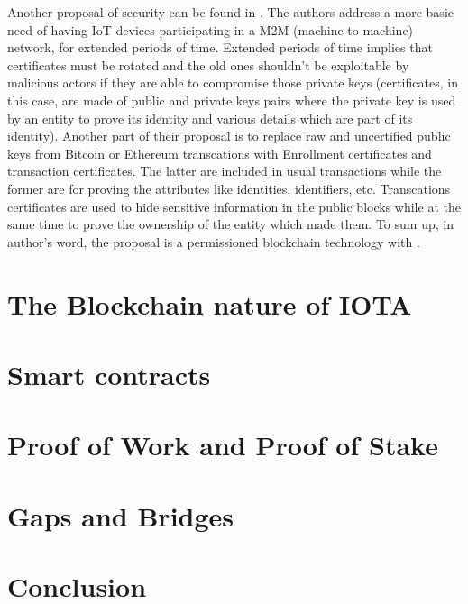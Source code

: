 \documentclass[a4paper,12pt,twoside]{book}
\begin{document}
    Another proposal of security can be found in \cite{SecuringUserIdentity}. The authors address a more basic need of having IoT devices participating in a M2M (machine-to-machine) network, for extended periods of time. Extended periods of time implies that certificates must be rotated and the old ones shouldn't be exploitable by malicious actors if they are able to compromise those private keys (certificates, in this case, are made of public and private keys pairs where the private key is used by an entity to prove its identity and various details which are part of its identity). Another part of their proposal is to replace raw and uncertified public keys from Bitcoin or Ethereum transcations with Enrollment certificates and transaction certificates. The latter are included in usual transactions while the former are for proving the attributes like identities, identifiers, etc. Transcations certificates are used to hide sensitive information in the public blocks while at the same time to prove the ownership of the entity which made them. To sum up, in author's word, the proposal is a permissioned blockchain technology with .




\section{The Blockchain nature of IOTA}
\label{sec:IOTABlockchainNature}

\section{Smart contracts}
\label{sec:SmartContracts}

\section{Proof of Work and Proof of Stake}
\label{sec:PoWandPoS}


\section{Gaps and Bridges}
\label{sec:GapsBridges}

\section{Conclusion}
\label{sec:Conclusion}


\end{document}
